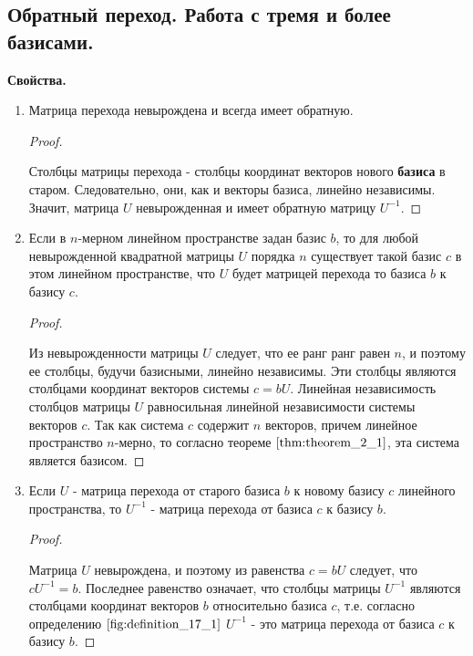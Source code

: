 \newpage


\subsection{
    Обратный переход. Работа с тремя и более базисами.
}

\textbf{Свойства.}

\begin{enumerate}[label={\arabic*°.}]
    \item Матрица перехода невырождена и всегда имеет обратную.
    \begin{proof}~

        Столбцы матрицы перехода - столбцы координат векторов нового \textbf{базиса} в старом. Следовательно, они, как и векторы базиса, линейно независимы. Значит, матрица $U$ невырожденная и имеет обратную матрицу $U^{-1}$.
    \end{proof}
    
    \item Если в $n$-мерном линейном пространстве задан базис $b$, то для любой невырожденной квадратной матрицы $U$ порядка $n$ существует такой базис $c$ в этом линейном пространстве, что $U$ будет матрицей перехода то базиса $b$ к базису $c$.
    \begin{proof}~

        Из невырожденности матрицы $U$ следует, что ее ранг ранг равен $n$, и поэтому ее столбцы, будучи базисными, линейно независимы. Эти столбцы являются столбцами координат векторов системы $c = bU$. Линейная независимость столбцов матрицы $U$ равносильная линейной независимости системы векторов $c$. Так как система $c$ содержит $n$ векторов, причем линейное пространство $n$-мерно, то согласно теореме $\eqref{thm:theorem_2_1}$, эта система является базисом.
    \end{proof}
    
    \item Если $U$ - матрица перехода от старого базиса $b$ к новому базису $c$ линейного пространства, то $U^{-1}$ - матрица перехода от базиса $c$ к базису $b$.
    \begin{proof}~

        Матрица $U$ невырождена, и поэтому из равенства $c = bU$ следует, что $cU^{-1} = b$. Последнее равенство означает, что столбцы матрицы $U^{-1}$ являются столбцами координат векторов $b$ относительно базиса $c$, т.е. согласно определению $\eqref{fig:definition_17_1}$ $U^{-1}$ - это матрица перехода от базиса $c$ к базису $b$.
    \end{proof}


\end{enumerate}
